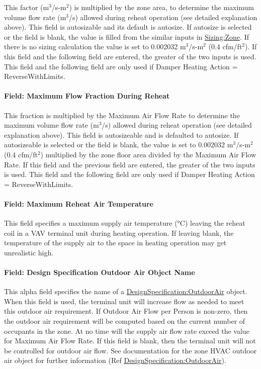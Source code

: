 This factor (m\(^{3}\)/s-m\(^{2}\)) is multiplied by the zone area, to determine the maximum volume flow rate (m\(^{3}\)/s) allowed during reheat operation (see detailed explanation above). This field is autosizable and its default is autosize. If autosize is selected or the field is blank, the value is filled from the similar inputs in \hyperref[sizingzone]{Sizing:Zone}. If there is no sizing calculation the value is set to 0.002032 m\(^{3}\)/s-m\(^{2}\) (0.4 cfm/ft\(^{2}\)). If this field and the following field are entered, the greater of the two inputs is used. This field and the following field are only used if Damper Heating Action = ReverseWithLimits.

\paragraph{Field: Maximum Flow Fraction During Reheat}\label{field-maximum-flow-fraction-during-reheat}

This fraction is multiplied by the Maximum Air Flow Rate to determine the maximum volume flow rate (m\(^{3}\)/s) allowed during reheat operation (see detailed explanation above). This field is autosizeable and is defaulted to autosize. If autosizeable is selected or the field is blank, the value is set to 0.002032 m\(^{3}\)/s-m\(^{2}\) (0.4 cfm/ft\(^{2}\)) multiplied by the zone floor area divided by the Maximum Air Flow Rate. If this field and the previous field are entered, the greater of the two inputs is used. This field and the following field are only used if Damper Heating Action = ReverseWithLimits.

\paragraph{Field: Maximum Reheat Air Temperature}\label{field-maximum-reheat-air-temperature-1}

This field specifies a maximum supply air temperature (°C) leaving the reheat coil in a VAV terminal unit during heating operation. If leaving blank, the temperature of the supply air to the space in heating operation may get unrealistic high.

\paragraph{Field: Design Specification Outdoor Air Object Name}\label{field-design-specification-outdoor-air-object-name}

This alpha field specifies the name of a \hyperref[designspecificationoutdoorair]{DesignSpecification:OutdoorAir} object. When this field is used, the terminal unit will increase flow as needed to meet this outdoor air requirement. If Outdoor Air Flow per Person is non-zero, then the outdoor air requirement will be computed based on the current number of occupants in the zone. At no time will the supply air flow rate exceed the value for Maximum Air Flow Rate. If this field is blank, then the terminal unit will not be controlled for outdoor air flow. See documentation for the zone HVAC outdoor air object for further information (Ref \hyperref[designspecificationoutdoorair]{DesignSpecification:OutdoorAir}).

